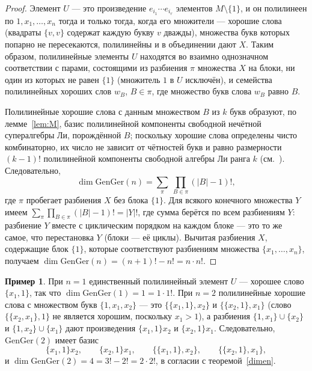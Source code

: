 \documentclass[11pt,reqno]{amsart}
\theoremstyle{plain}
\theoremstyle{definition}
\newtheorem{example}{Пример}
\theoremstyle{remark}
\begin{document}
\begin{proof}
Элемент $U$ --- это произведение $e_{i_1}\cdots e_{i_r}$ элементов $M\setminus\{1\}$, и он полилинеен по $1,x_1,\dots,x_n$ тогда и только тогда, когда его множители --- хорошие слова (квадраты $\{v,v\}$ содержат каждую букву $v$ дважды), множества букв которых попарно не пересекаются, полилинейны и в объединении дают $X$.
Таким образом, полилинейные элементы $U$ находятся во взаимно однозначном соответствии с парами, состоящими из разбиения $\pi$ множества $X$ на блоки, ни один из которых не равен $\{1\}$ (множитель $1$ в $U$ исключён), и семейства полилинейных хороших слов $w_B$, $B\in\pi$, где множество букв слова $w_B$ равно $B$.

Полилинейные хорошие слова с данным множеством $B$ из $k$ букв образуют, по лемме~\ref{lem:M}, базис полилинейной компоненты свободной нечётной супералгебры Ли, порождённой $B$; поскольку хорошие слова определены чисто комбинаторно, их число не зависит от чётностей букв и равно размерности $(k-1)!$ полилинейной компоненты свободной алгебры Ли ранга $k$ (см.~\cite{Reu93}).
Следовательно,
$$
\dim\mathrm{GenGer}(n)=\sum_{\pi}\ \prod_{B\in\pi}(|B|-1)!,
$$
где $\pi$ пробегает разбиения $X$ без блока $\{1\}$.
Для всякого конечного множества $Y$ имеем $\sum_{\pi}\prod_{B\in\pi}(|B|-1)!=|Y|!$, где сумма берётся по всем разбиениям $Y$: разбиение $Y$ вместе с циклическим порядком на каждом блоке --- это то же самое, что перестановка $Y$ (блоки --- её циклы).
Вычитая разбиения $X$, содержащие блок $\{1\}$, которые соответствуют разбиениям множества $\{x_1,\dots,x_n\}$, получаем $\dim\mathrm{GenGer}(n)=(n+1)!-n!=n\cdot n!$.
\end{proof}

\begin{example}\label{ex:small}
При $n=1$ единственный полилинейный элемент $U$ --- хорошее слово $\{x_1,1\}$, так что $\dim\mathrm{GenGer}(1)=1=1\cdot1!$.
При $n=2$ полилинейные хорошие слова с множеством букв $\{1,x_1,x_2\}$ --- это $\{\{x_1,1\},x_2\}$ и $\{\{x_2,1\},x_1\}$ (слово $\{\{x_2,x_1\},1\}$ не является хорошим, поскольку $x_1>1$), а разбиения $\{1,x_1\}\cup\{x_2\}$ и $\{1,x_2\}\cup\{x_1\}$ дают произведения $\{x_1,1\}x_2$ и $\{x_2,1\}x_1$.
Следовательно, $\mathrm{GenGer}(2)$ имеет базис
$$
\{x_1,1\}x_2,\qquad \{x_2,1\}x_1,\qquad \{\{x_1,1\},x_2\},\qquad \{\{x_2,1\},x_1\},
$$
и $\dim\mathrm{GenGer}(2)=4=3!-2!=2\cdot2!$, в согласии с теоремой~\ref{dimen}.
\end{example}
\end{document}
